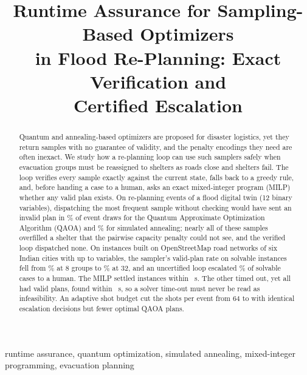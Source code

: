 \documentclass[conference]{IEEEtran}
\begin{document}
\title{Runtime Assurance for Sampling-Based Optimizers\\
in Flood Re-Planning: Exact Verification and\\
Certified Escalation}

\author{
}

\maketitle

\begin{abstract}
Quantum and annealing-based optimizers are proposed for disaster logistics, yet they return samples with no guarantee of validity, and the penalty encodings they need are often inexact. We study how a re-planning loop can use such samplers safely when evacuation groups must be reassigned to shelters as roads close and shelters fail. The loop verifies every sample exactly against the current state, falls back to a greedy rule, and, before handing a case to a human, asks an exact mixed-integer program (MILP) whether any valid plan exists. On \TwinEvents{} re-planning events of a flood digital twin (12 binary variables), dispatching the most frequent sample without checking would have sent an invalid plan in \TwinRawQ\% of event draws for the Quantum Approximate Optimization Algorithm (QAOA) and \TwinRawSA\% for simulated annealing; nearly all of these samples overfilled a shelter that the pairwise capacity penalty could not see, and the verified loop dispatched none. On \CityN{} instances built on OpenStreetMap road networks of six Indian cities with up to \CityMaxVars{} variables, the sampler's valid-plan rate on solvable instances fell from \CitySAFoundEight\% at 8 groups to \CitySAFoundThirtyTwo\% at 32, and an uncertified loop escalated \CityFalseEsc\% of solvable cases to a human. The MILP settled \CitySettled{} instances within \CityLimitS~s. The other \CityTimeout{} timed out, yet all had valid plans, found within \TimeoutMaxS~s, so a solver time-out must never be read as infeasibility. An adaptive shot budget cut the shots per event from 64 to \AdaptShots{} with identical escalation decisions but fewer optimal QAOA plans.
\end{abstract}

\begin{IEEEkeywords}
runtime assurance, quantum optimization, simulated annealing, mixed-integer programming, evacuation planning
\end{IEEEkeywords}
\end{document}
